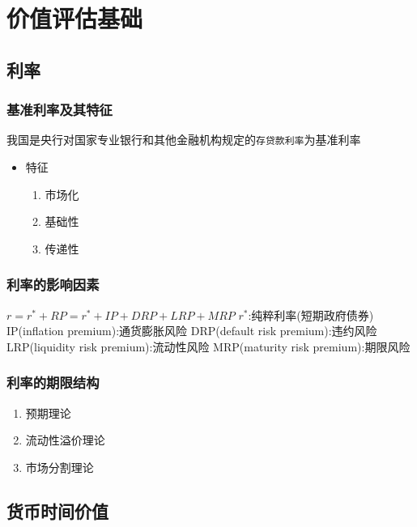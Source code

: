 \documentclass[11pt]{article}
\begin{document}
\section{价值评估基础}
\label{sec:org312e365}
\subsection{利率}
\label{sec:org827ff16}
\subsubsection{基准利率及其特征}
\label{sec:org33c2a8c}
我国是央行对国家专业银行和其他金融机构规定的\texttt{存贷款利率}为基准利率
\begin{itemize}
\item 特征
\begin{enumerate}
\item 市场化
\item 基础性
\item 传递性
\end{enumerate}
\end{itemize}
\subsubsection{利率的影响因素}
\label{sec:orgf026eda}
\(r = r^{*} + RP = r^{*} +IP +DRP + LRP + MRP\)
\(r^{*}\):纯粹利率(短期政府债券)
IP(inflation premium):通货膨胀风险
DRP(default risk premium):违约风险
LRP(liquidity risk premium):流动性风险
MRP(maturity risk premium):期限风险
\subsubsection{利率的期限结构}
\label{sec:org0237703}
\begin{enumerate}
\item 预期理论
\item 流动性溢价理论
\item 市场分割理论
\end{enumerate}
\subsection{货币时间价值}
\label{sec:org73bc612}
\end{document}
